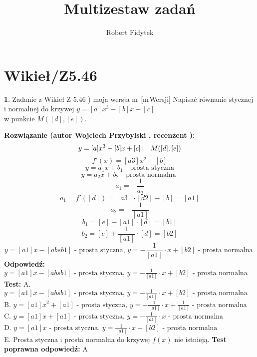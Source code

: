 \documentclass[12pt, a4paper]{article}
\title{Multizestaw zadań}
\author{Robert Fidytek}
\date{}
\theoremstyle{definition} %
\newtheorem{zad}{}
\newcommand{\kategoria}[1]{\section{#1}} %
\newcommand{\zadStart}[1]{\begin{zad}#1\newline} %
\newcommand{\zadStop}{\end{zad}}   %
\newcommand{\rozwStart}[2]{\noindent \textbf{Rozwiązanie (autor #1 , recenzent #2): }\newline} %
\newcommand{\rozwStop}{\newline}                                            %
\newcommand{\odpStart}{\noindent \textbf{Odpowiedź:}\newline}    %
\newcommand{\odpStop}{\newline}                                             %
\newcommand{\testStart}{\noindent \textbf{Test:}\newline} %
\newcommand{\testStop}{\newline} %
\newcommand{\kluczStart}{\noindent \textbf{Test poprawna odpowiedź:}\newline} %
\newcommand{\kluczStop}{\newline} %
\begin{document}
\maketitle


\kategoria{Wikieł/Z5.46}
\zadStart{Zadanie z Wikieł Z 5.46 ) moja wersja nr [nrWersji]}
Napisać równanie stycznej i normalnej do krzywej $y=[a]x^{3}-[b]x+[c]$ \\w punkcie $M([d],[e])$.
\zadStop
\rozwStart{Wojciech Przybylski}{}
$$ y=[a]x^{3}-[b]x+[c] \hspace{5mm} M([d],[e])$$
$$ f'(x)=[a3]x^{2}-[b]$$
$$y=a_{1}x+b_{1} \mbox{ - prosta styczna}$$
$$y=a_{2}x+b_{2} \mbox{ - prosta normalna }$$
$$a_{1}=-\frac{1}{a_{2}}$$
$$a_{1}=f'([d])=[a3]\cdot[d2]-[b]=[a1]$$
$$a_{2}=-\frac{1}{[a1]}$$
$$b_{1}=[e]-[a1]\cdot[d]=[b1]$$
$$b_{2}=[e]+\frac{1}{[a1]}\cdot[d]=[b2]$$
$$y=[a1]x-[absb1] \mbox{ - prosta styczna, }y=-\frac{1}{[a1]}\cdot x+[b2] \mbox{ - prosta normalna }$$
\rozwStop
\odpStart
$y=[a1]x-[absb1] \mbox{ - prosta styczna, }y=-\frac{1}{[a1]}\cdot x+[b2] \mbox{ - prosta normalna }$
\odpStop
\testStart
A. $y=[a1]x-[absb1] \mbox{ - prosta styczna, }y=-\frac{1}{[a1]}\cdot x+[b2] \mbox{ - prosta normalna }$\\
B. $y=[a1]x^{2}+[a1] \mbox{ - prosta styczna, }y=-\frac{1}{[a1]}\cdot x+\frac{1}{[a1]} \mbox{ - prosta normalna }$\\
C. $y=[a1]x+[a1] \mbox{ - prosta styczna, }y=-\frac{1}{[a1]}\cdot x \mbox{ - prosta normalna }$\\
D. $y=[a1]x \mbox{ - prosta styczna, }y=\frac{1}{[a1]}\cdot x+[b2] \mbox{ - prosta normalna }$\\
E. Prosta styczna i prosta normalna do krzywej $f(x)$ nie istnieją.
\testStop
\kluczStart
A
\kluczStop
\end{document}
